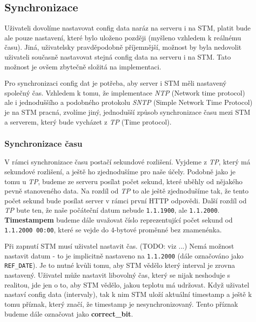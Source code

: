 \subsection{Synchronizace}

Uživateli dovolíme nastavovat config data naráz na serveru i na STM, platit bude ale pouze
nastavení, které bylo uloženo později (myšleno vzhledem k reálnému času).
Jiná, uživatelsky pravděpodobně příjemnější, možnost by byla nedovolit uživateli současně
nastavovat stejná config data na serveru i na STM.
Tato možnost je ovšem zbytečně složitá na implementaci.

Pro synchronizaci config dat je potřeba, aby server i STM měli nastavený společný čas.
Vzhledem k tomu, že implementace \emph{NTP} (Network time protocol) ale i jednoduššího a podobného
protokolu \emph{SNTP} (Simple Network Time Protocol) je na STM pracná, zvolíme jiný, jednodušší způsob synchronizace
času mezi STM a serverem, který bude vycházet z \emph{TP} (Time protocol).

\subsubsection{Synchronizace času}
V rámci synchronizace času postačí sekundové rozlišení.
Vyjdeme z \emph{TP}, který má sekundové rozlišení, a ještě ho zjednodušíme pro naše účely.
Podobně jako je tomu u \emph{TP}, budeme ze serveru posílat počet sekund, které
uběhly od nějakého pevně stanoveného data.
Na rozdíl od \emph{TP} to ale ještě zjednodušíme tak, že tento počet sekund bude posílat server
v rámci první HTTP odpovědi.
Další rozdíl od \emph{TP} bute ten, že naše počáteční datum nebude \texttt{1.1.1900}, ale \texttt{1.1.2000}.
\textbf{Timestampem} budeme dále uvažovat číslo reprezentující počet sekund od \texttt{1.1.2000 00:00},
které se vejde do 4-bytové proměnné bez znamenénka.

Při zapnutí STM musí uživatel nastavit čas. (TODO: viz ...)
Nemá možnost nastavit datum - to je implicitně nastaveno na \texttt{1.1.2000} (dále označováno jako \texttt{REF\_DATE}).
Je to nutné kvůli tomu, aby STM vědělo který interval je zrovna nastavený.
Uživatel může nastavit libovolný čas, který se nijak neshoduje s realitou, jde jen o to,
aby STM vědělo, jakou teplotu má udržovat.
Když uživatel nastaví config data (intervaly), tak k nim STM uloží aktuální timestamp
a ještě k tomu příznak, který značí, že timestamp je nesynchronizovaný.
Tento příznak budeme dále označovat jako \textbf{correct\_bit}.

